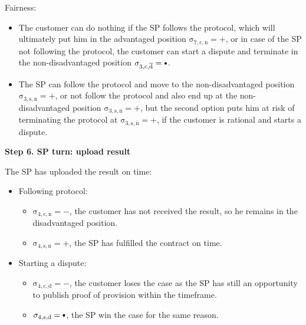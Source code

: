 \documentclass{ieeeaccess}
\newcommand\neutral[1][.75]{\mathbin{\ThisStyle{\vcenter{\hbox{%
  \scalebox{#1}{$\SavedStyle\bullet$}}}}}%
}
\begin{document}
Fairness:

\begin{itemize}

\item
  The customer can do nothing if the SP follows the protocol, which will ultimately put him in the advantaged position \(\operatorname{\sigma_{7, c, n} = +}\), or in case of the SP not following the protocol, the customer can start a dispute and terminate in the non-disadvantaged position \(\operatorname{\sigma_{3, c, \overline{d}} = \neutral}\).
\item
  The SP can follow the protocol and move to the non-disadvantaged position \(\operatorname{\sigma_{3, s, n} = +}\), or not follow the protocol and also end up at the non-disadvantaged position \(\operatorname{\sigma_{3, s, \overline{n}} = +}\), but the second option puts him at risk of terminating the protocol at \(\operatorname{\sigma_{3, s, \overline{n}} = +}\), if the customer is rational and starts a dispute.
\end{itemize}

\noindent \textbf
{Step 6. SP turn: upload result}\label{step-6-publication-of-results}

The SP has uploaded the result on time:


\begin{itemize}
\item
  Following protocol:

  \begin{itemize}
  
  \item
    \(\operatorname{\sigma_{4, c, n} = -}\), the customer has not received the result, so he remains in the disadvantaged position. 
  \item
    \(\operatorname{\sigma_{4, s, n} = +}\), the SP has fulfilled the contract on time.
  \end{itemize}
\item
  Starting a dispute:

  \begin{itemize}
  
  \item
    \(\operatorname{\sigma_{4, c, d} = -}\), the customer loses the case as the SP has still an opportunity to publish proof of provision within the timeframe. 
  \item
    \(\operatorname{\sigma_{4, s, d} = \neutral}\), the SP win the case for the same reason.
  \end{itemize}
\end{itemize}
\end{document}
